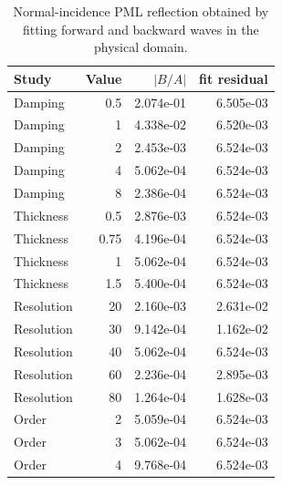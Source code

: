 \begin{table}[htbp]
\centering
\begin{tabular}{lrrr}
\toprule
Study & Value & $|B/A|$ & fit residual \\
\midrule
Damping & 0.5 & 2.074e-01 & 6.505e-03 \\
Damping & 1 & 4.338e-02 & 6.520e-03 \\
Damping & 2 & 2.453e-03 & 6.524e-03 \\
Damping & 4 & 5.062e-04 & 6.524e-03 \\
Damping & 8 & 2.386e-04 & 6.524e-03 \\
Thickness & 0.5 & 2.876e-03 & 6.524e-03 \\
Thickness & 0.75 & 4.196e-04 & 6.524e-03 \\
Thickness & 1 & 5.062e-04 & 6.524e-03 \\
Thickness & 1.5 & 5.400e-04 & 6.524e-03 \\
Resolution & 20 & 2.160e-03 & 2.631e-02 \\
Resolution & 30 & 9.142e-04 & 1.162e-02 \\
Resolution & 40 & 5.062e-04 & 6.524e-03 \\
Resolution & 60 & 2.236e-04 & 2.895e-03 \\
Resolution & 80 & 1.264e-04 & 1.628e-03 \\
Order & 2 & 5.059e-04 & 6.524e-03 \\
Order & 3 & 5.062e-04 & 6.524e-03 \\
Order & 4 & 9.768e-04 & 6.524e-03 \\
\bottomrule
\end{tabular}
\caption{Normal-incidence PML reflection obtained by fitting forward and backward waves in the physical domain.}
\label{tab:pmlReflection}
\end{table}
